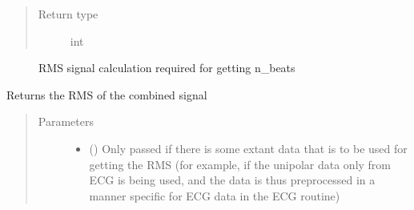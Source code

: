\documentclass[letterpaper,10pt,english]{sphinxmanual}
\begin{document}
\begin{fulllineitems}
\begin{fulllineitems}
\begin{quote}
\begin{description}
\item[{Return type}] \leavevmode
\sphinxAtStartPar
int

\end{description}\end{quote}


\nopagebreak

\begin{description}
\item[{{\hyperref[\detokenize{_autosummary/signalanalysis.general.Signal:id1}]{}}}] \leavevmode
\sphinxAtStartPar
RMS signal calculation required for getting n\_beats

\end{description}



\end{fulllineitems}


\begin{fulllineitems}
\label{\detokenize{_autosummary/signalanalysis.vcg.Vcg:signalanalysis.vcg.Vcg.get_rms}}
\sphinxAtStartPar
Returns the RMS of the combined signal
\begin{quote}\begin{description}
\item[{Parameters}] \leavevmode\begin{itemize}
\item {} 
\sphinxAtStartPar
{} (\sphinxstyleliteralemphasis{\sphinxupquote{, }}) \textendash{} Only passed if there is some extant data that is to be used for getting the RMS (for example,
if the unipolar data only from ECG is being used, and the data is thus preprocessed in a manner specific
for ECG data in the ECG routine)


\end{itemize}
\end{description}
\end{quote}
\end{fulllineitems}
\end{fulllineitems}
\end{document}
